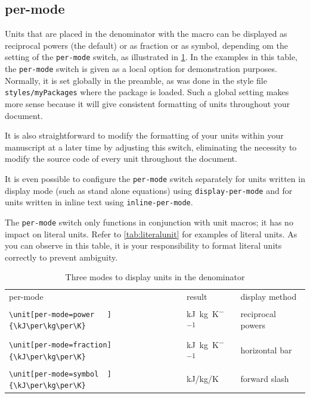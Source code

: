 \subsection{per-mode}
Units that are placed in the denominator with the  macro can be displayed as reciprocal powers (the default) or as fraction or as symbol, depending om the setting of the \texttt{per-mode} switch, as illustrated in \cref{tab:displayunits}. In the examples in this table, the \texttt{per-mode} switch is given as a local option for demonstration purposes. Normally, it is set globally in the preamble, as was done in the style file \texttt{styles/myPackages} where the package  is loaded. Such a global setting makes more sense because it will give consistent formatting of units throughout your document.

It is also straightforward to modify the formatting of your units within your manuscript at a later time by adjusting this switch, eliminating the necessity to modify the source code of every unit throughout the document.

It is even possible to configure the \texttt{per-mode} switch separately for units written in display mode (such as stand alone equations) using \texttt{display-per-mode} and for units written in inline text using \texttt{inline-per-mode}.

The \texttt{per-mode} switch only functions in conjunction with unit macros; it has no impact on literal units. Refer to \cref{tab:literalunit} for examples of literal units. As you can observe in this table, it is your responsibility to format literal units correctly to prevent ambiguity.

\begin{table}\centering
    \caption{Three modes to display units in the denominator}\label{tab:displayunits}
    \renewcommand{\arraystretch}{1.4} %
    \begin{tabular}{lll}
        \toprule
        per-mode                                              & result                                      & display method \\[+1.5ex]
        \verb|\unit[per-mode=power   ]{\kJ\per\kg\per\K}|     & \unit[per-mode=power]   {\kJ\per\kg\per\K}  & reciprocal powers \\
        \verb|\unit[per-mode=fraction]{\kJ\per\kg\per\K}|     & \unit[per-mode=fraction]{\kJ\per\kg\per\K}  & horizontal bar\\
        \verb|\unit[per-mode=symbol  ]{\kJ\per\kg\per\K}|     & \unit[per-mode=symbol]  {\kJ\per\kg\per\K}  & forward slash \\
        \bottomrule
    \end{tabular}
\end{table}

